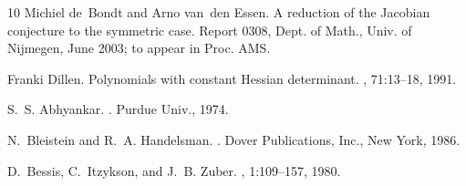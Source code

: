 \documentclass{article}
\newtheorem{main theorem}[defn]{Main Theorem}
\begin{document}
\begin{thebibliography}{10}
Michiel de~Bondt and Arno van~den Essen.
\newblock A reduction of the {J}acobian conjecture to the symmetric case.
\newblock Report 0308, Dept. of Math., Univ. of Nijmegen, June 2003; to appear
  in Proc. AMS.

Franki Dillen.
\newblock Polynomials with constant {H}essian determinant.
, 71:13--18, 1991.

S.~S. Abhyankar.
.
\newblock Purdue Univ., 1974.

N.~Bleistein and R.~A. Handelsman.
.
\newblock Dover Publications, Inc., New York, 1986.

D.~Bessis, C.~Itzykson, and J.~B. Zuber.
, 1:109--157, 1980.

\end{thebibliography}
\end{document}
